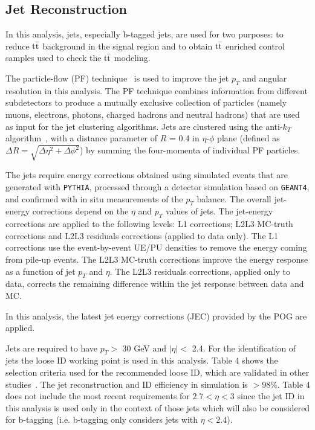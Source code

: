 \subsection{Jet Reconstruction}

In this analysis, jets, especially b-tagged jets, are used for two purposes: to reduce $\rm{t\bar{t}}$ background in the signal region and to obtain $\rm{t\bar{t}}$ enriched 
control samples used to check the $\rm{t\bar{t}}$ modeling.

The particle-flow (PF) technique~\cite{CMS-PAS-PFT-09-001,CMS-PAS-PFT-10-002} is used to improve the jet $p_T$ and angular resolution in this analysis.
The PF technique combines information from different subdetectors to produce a mutually exclusive collection of particles (namely muons, electrons, photons, 
charged hadrons and neutral hadrons) that are used as input for the jet clustering algorithms.
Jets are clustered using the anti-$k_{T}$ algorithm~\cite{anti-kT}, with a distance parameter of $R$ = 0.4 in $\eta$-$\phi$ plane (defined as $\Delta R = 
\sqrt{\Delta \eta^2 + \Delta \phi^2}$) by summing the four-momenta of individual PF particles.

The jets require energy corrections obtained using simulated events that are generated with \texttt{PYTHIA}, processed through a detector simulation based on 
\texttt{GEANT4}, and confirmed with in situ measurements of the $p_T$ balance.
The overall jet-energy corrections depend on the $\eta$ and $p_T$ values of jets.
The jet-energy corrections are applied to the following levels: L1 corrections; L2L3 MC-truth corrections and L2L3 residuals corrections (applied to data only). 
The L1 corrections use the event-by-event UE/PU densities to remove the energy coming from pile-up events.
The L2L3 MC-truth corrections improve the energy response as a function of jet $p_T$ and $\eta$.
The L2L3 residuals corrections, applied only to data, corrects the remaining difference within 
the jet response between data and MC.

In this analysis, the latest jet energy corrections (JEC) provided by the POG are applied.

Jets are required to have $p_T >$ 30 GeV and $|\eta| <$ 2.4.
For the identification of jets the loose ID working point is used in this analysis.
Table 4 shows the selection criteria used for the recommended loose ID, which are validated in other studies~\cite{CMS-PAS-FSQ-12-035}.
The jet reconstruction and ID efficiency in simulation is $>$98\%. Table 4 does not include the most recent requirements 
for $2.7 < \eta < 3$ since the jet ID in this analysis is used only in the context of those jets which will also be considered for b-tagging 
(i.e. b-tagging only considers jets with $\eta < 2.4$).

